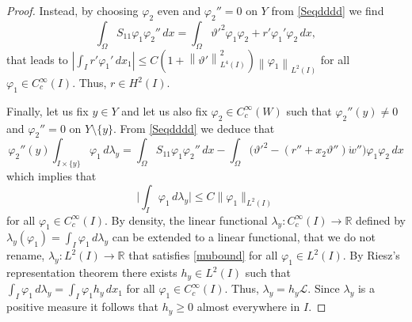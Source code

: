 \documentclass[a4, 11pt, reqno, final]{amsart}
\newcommand{\calL}{\mathcal{L}}
\newcommand{\n}[1]{\left\|#1\right\|}  %
\theoremstyle{plain}%
\newcommand{\QED}{\hspace{1ex}\hfill$\blacksquare$\vspace{2ex}}
\begin{document}
\begin{proof}
		Instead, by choosing $\varphi_2$ even and $\varphi_2''=0$ on $Y$ from \eqref{Seqdddd} we find
		$$
		\int_\Omega S_{11}\varphi_1\varphi_2''\, dx=
		\int_\Omega \vartheta'^2\varphi_1\varphi_2+ r'\varphi_1'\varphi_2\, dx,
		$$
		that leads to
		$|\int_I r' \varphi_1' \, dx_1| \leq C(1 + \n{\vartheta'}_{L^4(I)}^{2})\n{\varphi_1}_{L^2(I)}$
		for all  $\varphi_1 \in C_c^\infty(I)$. Thus, $r \in H^2(I)$.


		Finally, let us fix $y\in Y$ and let us also fix $\varphi_2 \in C_c^\infty(W)$ such that
		$\varphi_2''(y)\ne 0$ and $\varphi_2''=0$ on $Y\setminus\{y\}$. From \eqref{Seqdddd} we deduce that
		$$
		\varphi_2''(y)\int_{I\times\{y\}} \varphi_1\,d\lambda_y=
		\int_\Omega S_{11}\varphi_1\varphi_2''\, dx-
		\int_\Omega \big( \vartheta'^2- (r''+x_2\vartheta'')\mathring{w}''\big)\varphi_1\varphi_2\, dx
		$$
		which implies that
		\begin{equation}\label{mubound}
			\Big|\int_{I} \varphi_1\,d\lambda_y\Big|\le C \|\varphi_1\|_{L^2(I)}
		\end{equation}
		for all  $\varphi_1 \in C_c^\infty(I)$. By density, the linear functional $\lambda_y:C_c^\infty(I) \to \mathbb{R}$ defined by $\lambda_y(\varphi_1)=\int_{I} \varphi_1\,d\lambda_y$ can be extended to a linear functional, that we do not rename, $\lambda_y:L^2(I) \to \mathbb{R}$ that satisfies \eqref{mubound} for all $\varphi_1\in L^2(I)$.
		By Riesz's representation theorem there exists $h_y\in L^2(I)$ such that $\int_{I} \varphi_1\,d\lambda_y=\int_{I} \varphi_1h_y\,dx_1$ for all  $\varphi_1 \in C_c^\infty(I)$. Thus, $\lambda_y=h_y\calL$. Since $\lambda_y$ is a positive measure it follows that $h_y\ge 0$ almost everywhere in $I$.
	\end{proof}
\end{document}
